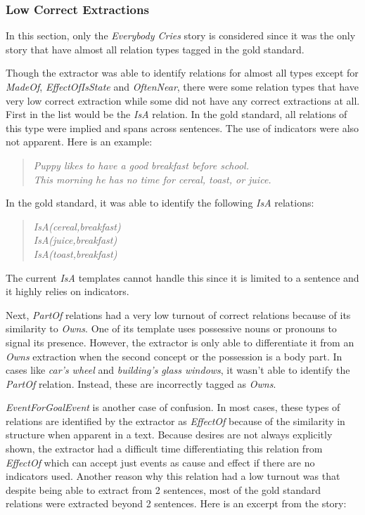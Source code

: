 \subsubsection*{Low Correct Extractions}

In this section, only the \textit{Everybody Cries} story is considered since it was the only story that have almost all relation types tagged in the gold standard. 

Though the extractor was able to identify relations for almost all types except for \textit{MadeOf}, \textit{EffectOfIsState} and \textit{OftenNear}, there were some relation types that have very low correct extraction while some did not have any correct extractions at all. First in the list would be the \textit{IsA} relation. In the gold standard, all relations of this type were implied and spans across sentences. The use of indicators were also not apparent. Here is an example:

\begin{verse}
\itshape
Puppy likes to have a good breakfast before school. \\
This morning he has no time for cereal, toast, or juice.\\
\end{verse}

In the gold standard, it was able to identify the following \textit{IsA} relations:

\begin{verse}
\itshape
IsA(cereal,breakfast)\\
IsA(juice,breakfast)\\
IsA(toast,breakfast)\\
\end{verse}

The current \textit{IsA} templates cannot handle this since it is limited to a sentence and it highly relies on indicators.

Next, \textit{PartOf} relations had a very low turnout of correct relations because of its similarity to \textit{Owns}. One of its template uses possessive nouns or pronouns to signal its presence. However, the extractor is only able to differentiate it from an \textit{Owns} extraction when the second concept or the possession is a body part. In cases like \textit{car's wheel} and \textit{building's glass windows}, it wasn't able to identify the \textit{PartOf} relation. Instead, these are incorrectly tagged as \textit{Owns}.

\textit{EventForGoalEvent} is another case of confusion. In most cases, these types of relations are identified by the extractor as \textit{EffectOf} because of the similarity in structure when apparent in a text. Because desires are not always explicitly shown, the extractor had a difficult time differentiating this relation from \textit{EffectOf} which can accept just events as cause and effect if there are no indicators used. Another reason why this relation had a low turnout was that despite being able to extract from 2 sentences, most of the gold standard relations were extracted beyond 2 sentences. Here is an excerpt from the story:

